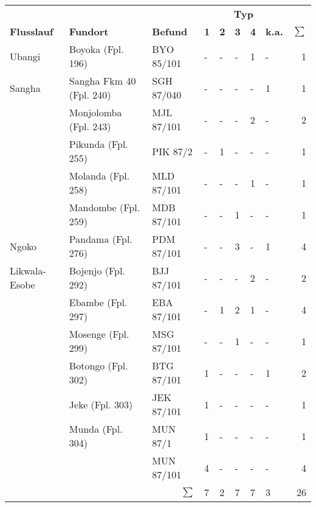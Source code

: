 \begin{tabular}{@{}llllllllr@{}}
	\toprule
	{}            & {}                       & {}            & \multicolumn{5}{c}{\textbf{Typ}} &   \\
	\textbf{Flusslauf}    & \textbf{Fundort}                      & \textbf{Befund}        & \textbf{1}    & \textbf{2}    & \textbf{3}    & \textbf{4}    & \textbf{k.a.}     & \textbf{$\sum$} \\ \midrule
	Ubangi        & Boyoka (Fpl. 196)        & BYO 85/101    & -   & -   & -   & 1   & -    &  1 \\
	Sangha        & Sangha Fkm 40 (Fpl. 240) & SGH 87/040 & -   & -   & -   & -   & 1    &  1 \\
	{}            & Monjolomba (Fpl. 243)    & MJL 87/101    & -   & -   & -   & 2   & -    &  2 \\
	{}            & Pikunda (Fpl. 255)       & PIK 87/2      & -   & 1   & -   & -   & -    &  1 \\
	{}            & Molanda (Fpl. 258)       & MLD 87/101    & -   & -   & -   & 1   & -    &  1 \\
	{}            & Mandombe (Fpl. 259)      & MDB 87/101    & -   & -   & 1   & -   & -    &  1 \\
	Ngoko         & Pandama (Fpl. 276)       & PDM 87/101    & -   & -   & 3   & -   & 1    &  4 \\
	Likwala-Esobe & Bojenjo (Fpl. 292)       & BJJ 87/101    & -   & -   & -   & 2   & -    &  2 \\
	{}            & Ebambe (Fpl. 297)        & EBA 87/101    & -   & 1   & 2   & 1   & -    &  4 \\
	{}            & Mosenge (Fpl. 299)       & MSG 87/101    & -   & -   & 1   & -   & -    &  1 \\
	{}            & Botongo (Fpl. 302)       & BTG 87/101    & 1   & -   & -   & -   & 1    &  2 \\
	{}            & Jeke (Fpl. 303)          & JEK 87/101    & 1   & -   & -   & -   & -    &  1 \\
	{}            & Munda (Fpl. 304)         & MUN 87/1      & 1   & -   & -   & -   & -    &  1 \\
	{}            & {}                       & MUN 87/101    & 4   & -   & -   & -   & -    &  4 \\ \midrule
	{}            & {}                       & \multicolumn{1}{r}{\textbf{$\sum$}}            & 7   & 2   & 7   & 7   & 3    & 26 \\ \bottomrule
\end{tabular}
